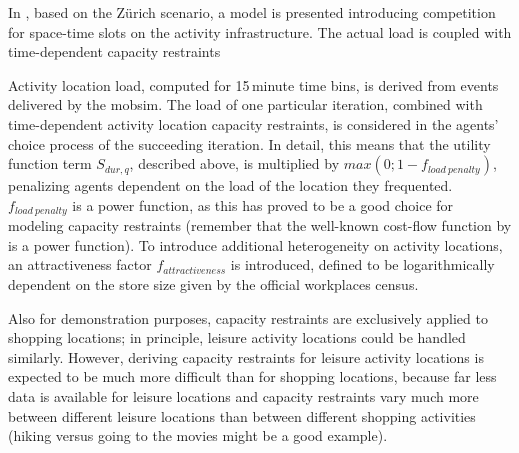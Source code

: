 In \citet[][]{HorniEtAl_TRR_2009}, based on the Zürich scenario, a 
model is presented introducing competition for space-time slots on the activity infrastructure. 
The actual load is coupled with time-dependent capacity restraints

Activity location load, computed for 15\,minute time bins, is derived from events delivered by the \gls{mobsim}. 
The load of one particular iteration, combined with time-dependent activity location capacity restraints, is considered in the agents' choice process of the succeeding iteration. 
In detail, this means that the utility function term $S_{dur,q}$, described above, is multiplied by $max(0; 1 - f_{load\ penalty})$, penalizing agents dependent on the load of the location they frequented. 
$f_{load\ penalty}$ is a power function, as this has proved to be a good choice for modeling capacity restraints (remember that the well-known cost-flow function by \citet[][]{TA_manual_1964} is a power function). 
To introduce additional heterogeneity on activity locations, an attractiveness factor $f_{attractiveness}$ is introduced, defined to be logarithmically dependent on the store size given by the official workplaces census.

Also for demonstration purposes, capacity restraints are exclusively applied to shopping locations; in principle, leisure activity locations could be handled similarly. However, deriving capacity restraints for leisure activity locations is expected to be much more difficult than for shopping locations, because far less data is available for leisure locations and capacity restraints vary much more between different leisure locations than between different shopping activities (hiking versus going to the movies might be a good example).

